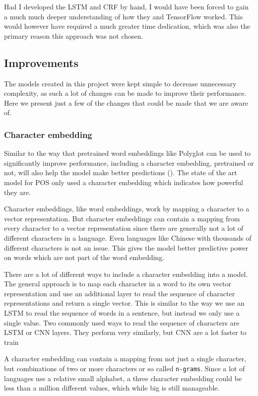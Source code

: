 Had I developed the LSTM and CRF by hand, I would have been forced to gain a
much much deeper understanding of how they and TensorFlow worked.
This would however have required a much greater time dedication, which was also
the primary reason this approach was not chosen.

\subsection{Improvements}

The models created in this project were kept simple to decrease unnecessary
complexity, as such a lot of changes can be made to improve their performance.
Here we present just a few of the changes that could be made that we are aware
of.

\subsubsection{Character embedding}

Similar to the way that pretrained word embeddings like Polyglot can be used to
significantly improve performance, including a character embedding, pretrained
or not, will also help the model make better predictions
(\cite{yang2018design}).  The state of the art model for POS only used a
character embedding which indicates how powerful they are.

Character embeddings, like word embeddings, work by mapping a character to a
vector representation. But character embeddings can contain a mapping from every
character to a vector representation since there are generally not a lot of
different characters in a language. Even languages like Chinese with thousands
of different characters is not an issue. This gives the model better predictive
power on words which are not part of the word embedding.

There are a lot of different ways to include a character embedding into a model.
The general approach is to map each character in a word to its own vector
representation and use an additional layer to read the sequence of character
representations and return a single vector. This is similar to the way we use an
LSTM to read the sequence of words in a sentence, but instead we only use a
single value. Two commonly used ways to read the sequence of characters are LSTM
or CNN layers. They perform very similarly, but CNN are a lot faster to
train~\cite{yang2018design}

A character embedding can contain a mapping from not just a single character,
but combinations of two or more characters or so called \texttt{n-grams}. Since
a lot of languages use a relative small alphabet, a three character embedding
could be less than a million different values, which while big is still
manageable.


